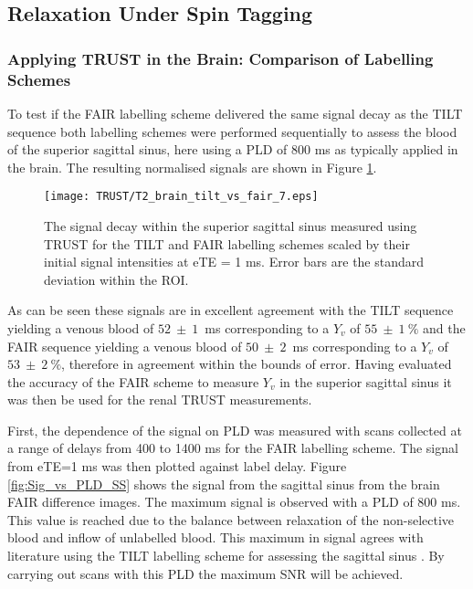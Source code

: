 \subsection{\ttwo Relaxation Under Spin Tagging}
\subsubsection{Applying \ac{TRUST} in the Brain: Comparison of Labelling Schemes}

To test if the \ac{FAIR} labelling scheme delivered the same signal decay as the \ac{TILT} sequence both labelling schemes were performed sequentially to assess the blood \ttwo of the superior sagittal sinus, here using a \ac{PLD} of 800 ms as typically applied in the brain. The resulting normalised signals are shown in Figure \ref{fig:TILT_vs_FAIR}.
\begin{figure}[H]
	\centering
	\texttt{[image: TRUST/T2\_brain\_tilt\_vs\_fair\_7.eps]}
	\caption{The signal decay within the superior sagittal sinus measured using \ac{TRUST} for the \ac{TILT} and \ac{FAIR} labelling schemes scaled by their initial signal intensities at eTE = 1 ms. Error bars are the standard deviation within the \ac{ROI}.}
	\label{fig:TILT_vs_FAIR}	
\end{figure}

As can be seen these signals are in excellent agreement with the \ac{TILT} sequence yielding a venous blood \ttwo of $52~\pm~1$~ms corresponding to a $Y_v$ of $55~\pm~1~\%$ and the \ac{FAIR} sequence yielding a venous blood \ttwo of $50~\pm~2$~ms corresponding to a $Y_v$ of $53~\pm~2~\%$, therefore in agreement within the bounds of error. Having evaluated the accuracy of the \ac{FAIR} scheme to measure $Y_v$ in the superior sagittal sinus it was then be used for the renal \ac{TRUST} measurements.

First, the dependence of the signal on \ac{PLD} was measured with scans collected at a range of delays from 400 to 1400 ms for the \ac{FAIR} labelling scheme. The signal from \ac{eTE}=1 ms was then plotted against label delay. Figure \ref{fig:Sig_vs_PLD_SS} shows the signal from the sagittal sinus from the brain \ac{FAIR} difference images. The maximum signal is observed with a \ac{PLD} of 800 ms. This value is reached due to the balance between \tone relaxation of the non-selective blood and inflow of unlabelled blood. This maximum in signal agrees with literature using the \ac{TILT} labelling scheme for assessing the sagittal sinus \cite{lu_quantitative_2008}. By carrying out scans with this \ac{PLD} the maximum \ac{SNR} will be achieved. 

